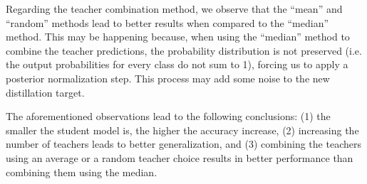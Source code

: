 Regarding the teacher combination method, we observe that the ``mean'' and ``random'' methods lead to better results when compared to the ``median'' method. This may be happening because, when using the ``median'' method to combine the teacher predictions, the probability distribution is not preserved (i.e. the output probabilities for every class do not sum to 1), forcing us to apply a posterior normalization step. This process may add some noise to the new distillation target.

The aforementioned observations lead to the following conclusions: (1) the smaller the student model is, the higher the accuracy increase, (2) increasing the number of teachers leads to better generalization, and (3) combining the teachers using an average or a random teacher choice results in better performance than combining them using the median.

